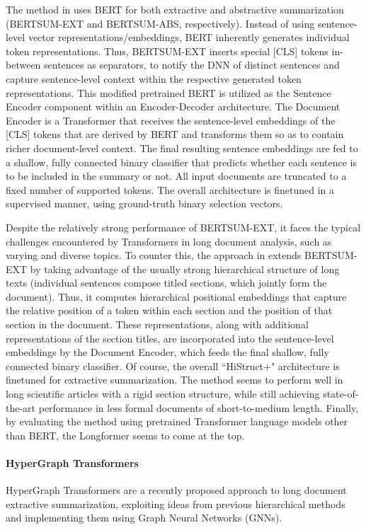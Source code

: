 \documentclass[preprint,review,10pt]{elsarticle}
\begin{document}
	The method in \cite{lapata_bert} uses BERT for both extractive and abstractive summarization (BERTSUM-EXT and BERTSUM-ABS, respectively). Instead of using sentence-level vector representations/embeddings, BERT inherently generates individual token representations. Thus, BERTSUM-EXT inserts special [CLS] tokens in-between sentences as separators, to notify the DNN of distinct sentences and capture sentence-level context within the respective generated token representations. This modified pretrained BERT is utilized as the Sentence Encoder component within an Encoder-Decoder architecture. The Document Encoder is a Transformer that receives the sentence-level embeddings of the [CLS] tokens that are derived by BERT and transforms them so as to contain richer document-level context. The final resulting sentence embeddings are fed to a shallow, fully connected binary classifier that predicts whether each sentence is to be included in the summary or not. All input documents are truncated to a fixed number of supported tokens. The overall architecture is finetuned in a supervised manner, using ground-truth binary selection vectors.
	
	Despite the relatively strong performance of BERTSUM-EXT, it faces the typical challenges encountered by Transformers in long document analysis, such as varying and diverse topics. To counter this, the approach in \cite{histruct} extends BERTSUM-EXT by taking advantage of the usually strong hierarchical structure of long texts (individual sentences compose titled sections, which jointly form the document). Thus, it computes hierarchical positional embeddings that capture the relative position of a token within each section and the position of that section in the document. These representations, along with additional representations of the section titles, are incorporated into the sentence-level embeddings by the Document Encoder, which feeds the final shallow, fully connected binary classifier. Of course, the overall ``HiStruct+" architecture is finetuned for extractive summarization. The method seems to perform well in long scientific articles with a rigid section structure, while still achieving state-of-the-art performance in less formal documents of short-to-medium length. Finally, by evaluating the method using pretrained Transformer language models other than BERT, the Longformer seems to come at the top.
	
	\paragraph{HyperGraph Transformers} HyperGraph Transformers are a recently proposed approach to long document extractive summarization, exploiting ideas from previous hierarchical methods and implementing them using Graph Neural Networks (GNNs).
	
\end{document}
